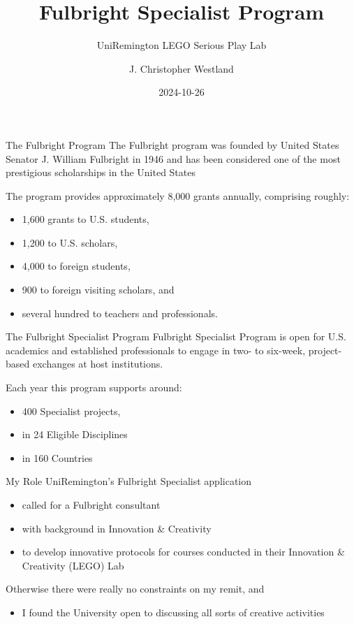 \documentclass[
  ignorenonframetext,
]{beamer}
\title{Fulbright Specialist Program}
\subtitle{UniRemington LEGO Serious Play Lab}
\author{J. Christopher Westland}
\date{2024-10-26}
\providecommand{\tightlist}{%
  \setlength{\itemsep}{0pt}\setlength{\parskip}{0pt}}
\begin{document}
\frame{\titlepage}

\begin{frame}{The Fulbright Program}
\label{the-fulbright-program}
The Fulbright program was founded by United States Senator J. William
Fulbright in 1946 and has been considered one of the most prestigious
scholarships in the United States

The program provides approximately 8,000 grants annually, comprising
roughly:

\begin{itemize}
\tightlist
\item
  1,600 grants to U.S. students,
\item
  1,200 to U.S. scholars,
\item
  4,000 to foreign students,
\item
  900 to foreign visiting scholars, and
\item
  several hundred to teachers and professionals.
\end{itemize}
\end{frame}

\begin{frame}{The Fulbright Specialist Program}
\label{the-fulbright-specialist-program}
Fulbright Specialist Program is open for U.S. academics and established
professionals to engage in two- to six-week, project-based exchanges at
host institutions.

Each year this program supports around:

\begin{itemize}
\tightlist
\item
  400 Specialist projects,
\item
  in 24 Eligible Disciplines
\item
  in 160 Countries
\end{itemize}
\end{frame}

\begin{frame}{My Role}
\label{my-role}
UniRemington's Fulbright Specialist application

\begin{itemize}
\tightlist
\item
  called for a Fulbright consultant
\item
  with background in Innovation \& Creativity
\item
  to develop innovative protocols for courses conducted in their
  Innovation \& Creativity (LEGO) Lab
\end{itemize}

Otherwise there were really no constraints on my remit, and

\begin{itemize}
\tightlist
\item
  I found the University open to discussing all sorts of creative
  activities
\end{itemize}
\end{frame}
\end{document}
